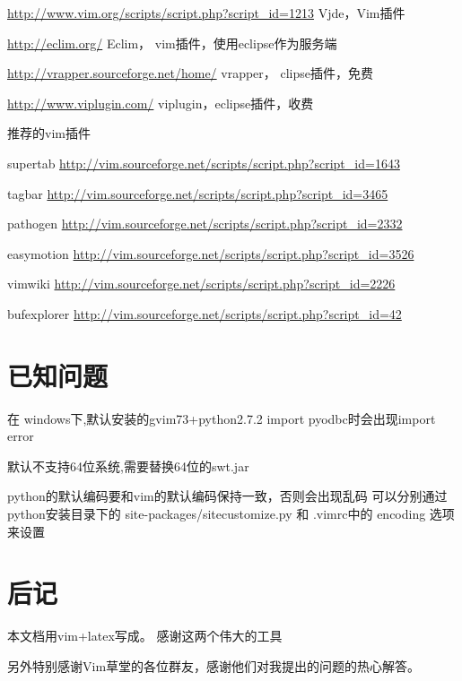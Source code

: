 \documentclass[oneside,openany]{book}
\begin{document}
  \href{http://www.vim.org/scripts/script.php?script\_id=1213}{http://www.vim.org/scripts/script.php?script\_id=1213} 
  Vjde，Vim插件
  \newline

  \href{http://eclim.org/}{http://eclim.org/} Eclim， vim插件，使用eclipse作为服务端
  \newline

  \href{http://vrapper.sourceforge.net/home/}{http://vrapper.sourceforge.net/home/}
  vrapper， clipse插件，免费
  \newline

  \href{http://www.viplugin.com/}{http://www.viplugin.com/}
  viplugin，eclipse插件，收费
  \newline

  推荐的vim插件

  supertab
  \href{http://vim.sourceforge.net/scripts/script.php?script\_id=1643}
   {http://vim.sourceforge.net/scripts/script.php?script\_id=1643}

  tagbar
  \href{http://vim.sourceforge.net/scripts/script.php?script\_id=3465}
   {http://vim.sourceforge.net/scripts/script.php?script\_id=3465}

  pathogen
  \href{http://vim.sourceforge.net/scripts/script.php?script\_id=2332}
   {http://vim.sourceforge.net/scripts/script.php?script\_id=2332}

  easymotion
  \href{http://vim.sourceforge.net/scripts/script.php?script\_id=3526}
   {http://vim.sourceforge.net/scripts/script.php?script\_id=3526}

  vimwiki
  \href{http://vim.sourceforge.net/scripts/script.php?script\_id=2226}
   {http://vim.sourceforge.net/scripts/script.php?script\_id=2226}


  bufexplorer
  \href{http://vim.sourceforge.net/scripts/script.php?script\_id=42}
   {http://vim.sourceforge.net/scripts/script.php?script\_id=42}

\chapter{已知问题}


    在 windows下,默认安装的gvim73+python2.7.2 import pyodbc时会出现import error 

    默认不支持64位系统,需要替换64位的swt.jar 

    python的默认编码要和vim的默认编码保持一致，否则会出现乱码 可以分别通过 python安装目录下的
    site-packages/sitecustomize.py 和 .vimrc中的 encoding 选项来设置 

\chapter{后记}
   本文档用vim+latex写成。 感谢这两个伟大的工具

   另外特别感谢Vim草堂的各位群友，感谢他们对我提出的问题的热心解答。
   
   
\end{document}
